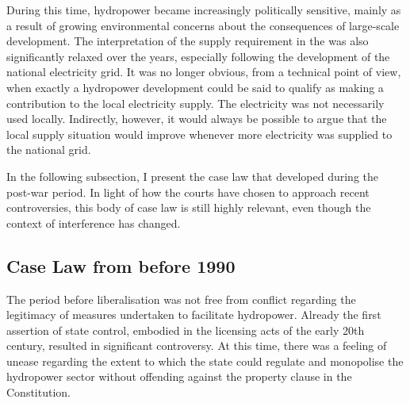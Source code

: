 During this time, hydropower became increasingly politically sensitive, mainly as a result of growing environmental concerns about the consequences of large-scale development. The interpretation of the supply requirement in the \cite{wra40} was also significantly relaxed over the years, especially following the development of the national electricity grid. It was no longer obvious, from a technical point of view, when exactly a hydropower development could be said to qualify as making a contribution to the local electricity supply. The electricity was not necessarily used locally. Indirectly, however, it would always be possible to argue that the local supply situation would improve whenever more electricity was supplied to the national grid.


In the following subsection, I present the case law that developed during the post-war period. In light of how the courts have chosen to approach recent controversies, this body of case law is still highly relevant, even though the context of interference has changed.

\subsection{Case Law from before 1990}\label{sec:prelib}

The period before liberalisation was not free from conflict regarding the legitimacy of measures undertaken to facilitate hydropower. Already the first assertion of state control, embodied in the licensing acts of the early 20th century, resulted in significant controversy. At this time, there was a feeling of unease regarding the extent to which the state could regulate and monopolise the hydropower sector without offending against the property clause in the Constitution.


